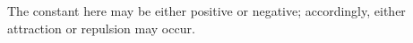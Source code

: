 The constant here may be either positive or negative; accordingly, either attraction or repulsion may occur.
